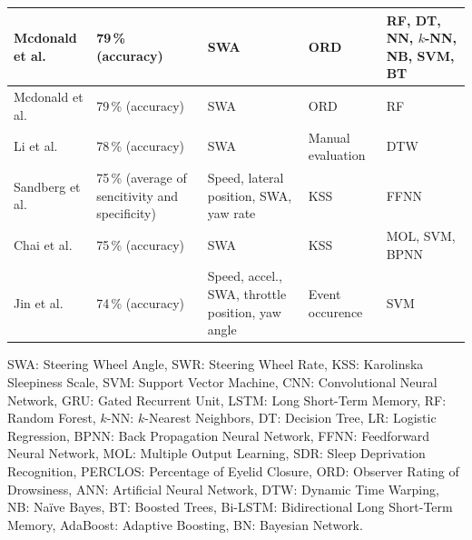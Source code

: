 \documentclass[letterpaper, 10 pt, conference]{ieeeconf}  %
\begin{document}
\begin{table}[t]
\begin{tabular}{|m{2.8cm}|m{3.0cm}|>{\centering\arraybackslash}m{4.7cm}|>{\centering\arraybackslash}m{2.0cm}|>{\centering\arraybackslash}m{3cm}|}
        \hline
        Mcdonald et al.
        \cite{Mcdonald2014} & 79\,\% (accuracy) & SWA & ORD & {RF, DT, NN, $k$-NN, NB, SVM, BT}\\
        \hline
        Mcdonald et al.
        \cite{Mcdonald2012} & 79\,\% (accuracy) & SWA & ORD & {RF} \\
        \hline
        Li et al.
        \cite{Li2017} & 78\,\% (accuracy) & SWA 
        & %
        Manual evaluation
        & {DTW} \\
        \hline
        Sandberg et al.
        \cite{Sandberg2008} & 
        75\,\% (average of sencitivity and specificity)
        & Speed, lateral position, SWA, yaw rate & KSS & {FFNN} \\
        \hline
        Chai et al.
        \cite{Chai2019} & 75\,\% (accuracy) & SWA & KSS & {MOL, SVM, BPNN} \\
        \hline
        Jin et al.
        \cite{Jin2012} & 74\,\% (accuracy) & Speed, accel., SWA, throttle position, yaw angle 
        & %
        \!\!\! Event occurence \!\!\!
        & {SVM} \\
        \hline
    \end{tabular}
    \begin{flushleft}
        SWA: Steering Wheel Angle, 
        SWR: Steering Wheel Rate, 
        KSS: Karolinska Sleepiness Scale, 
        SVM: Support Vector Machine, 
        CNN: Convolutional Neural Network, 
        GRU: Gated Recurrent Unit, 
        LSTM: Long Short-Term Memory, 
        RF: Random Forest, 
        $k$-NN: $k$-Nearest Neighbors, 
        DT: Decision Tree, 
        LR: Logistic Regression, 
        BPNN: Back Propagation Neural Network, 
        FFNN: Feedforward Neural Network, 
        MOL: Multiple Output Learning, 
        SDR: Sleep Deprivation Recognition, 
        PERCLOS: Percentage of Eyelid Closure, 
        ORD: Observer Rating of Drowsiness, 
        ANN: Artificial Neural Network, 
        DTW: Dynamic Time Warping, 
        NB: Naïve Bayes, 
        BT: Boosted Trees, 
        Bi-LSTM: Bidirectional Long Short-Term Memory, 
        AdaBoost: Adaptive Boosting, 
        BN: Bayesian Network.
    \end{flushleft} 
\end{table}
\end{document}
